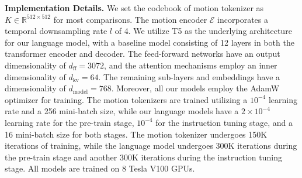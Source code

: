 \label{sec:comp:detail}
\textbf{Implementation Details.} We set the codebook of motion tokenizer as $K\in\mathbb{R}^{512\times512}$ for most comparisons. The motion encoder $\mathcal{E}$ incorporates a temporal downsampling rate $l$ of 4. 
We utilize T5 \cite{raffel2020t5} as the underlying architecture for our language model, with a baseline model consisting of 12 layers in both the transformer encoder and decoder. The feed-forward networks have an output dimensionality of $d_\text{ff} = 3072$, and the attention mechanisms employ an inner dimensionality of $d_\text{kv} = 64$. The remaining sub-layers and embeddings have a dimensionality of $d_\text{model} = 768$.
%
% 
Moreover, all our models employ the AdamW optimizer for training. The motion tokenizers are trained utilizing a $10^{-4}$ learning rate and a 256 mini-batch size, while our language models have a $2\times10^{-4}$ learning rate for the pre-train stage, $10^{-4}$ for the instruction tuning stage, and a 16 mini-batch size for both stages. The motion tokenizer undergoes 150K iterations of training, while the language model undergoes 300K iterations during the pre-train stage and another 300K iterations during the instruction tuning stage. All models are trained on 8 Tesla V100 GPUs.



